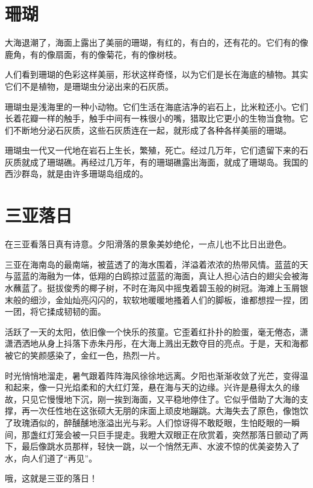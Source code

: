 \documentclass[12pt,UTF-8,openany]{ctexbook}
\begin{document}
\chapter{珊瑚}

\begin{large}
    
    大海退潮了，海面上露出了美丽的珊瑚，有红的，有白的，还有花的。它们有的像鹿角，有的像扇面，有的像菊花，有的像树枝。
    
    人们看到珊瑚的色彩这样美丽，形状这样奇怪，以为它们是长在海底的植物。其实它们不是植物，是珊瑚虫分泌出来的石灰质。
    
    珊瑚虫是浅海里的一种小动物。它们生活在海底洁净的岩石上，比米粒还小。它们长着花瓣一样的触手，触手中间有一株很小的嘴，猎取比它更小的生物当食物。它们不断地分泌石灰质，这些石灰质连在一起，就形成了各种各样美丽的珊瑚。
    
    珊瑚虫一代又一代地在岩石上生长，繁殖，死亡。经过几万年，它们遗留下来的石灰质就成了珊瑚礁。再经过几万年，有的珊瑚礁露出海面，就成了珊瑚岛。我国的西沙群岛，就是由许多珊瑚岛组成的。
    
\end{large}



\chapter{三亚落日}

\begin{large}
    
    在三亚看落日真有诗意。夕阳滑落的景象美妙绝伦，一点儿也不比日出逊色。
    
    三亚在海南岛的最南端，被蓝透了的海水围着，洋溢着浓浓的热带风情。蓝蓝的天与蓝蓝的海融为一体，低翔的白鸥掠过蓝蓝的海面，真让人担心洁白的翅尖会被海水蘸蓝了。挺拔俊秀的椰子树，不时在海风中摇曳着碧玉般的树冠。海滩上玉屑银末般的细沙，金灿灿亮闪闪的，软软地暖暖地搔着人们的脚板，谁都想捏一捏，团一团，将它揉成韧韧的面。
    
    活跃了一天的太阳，依旧像一个快乐的孩童。它歪着红扑扑的脸蛋，毫无倦态，潇潇洒洒地从身上抖落下赤朱丹彤，在大海上溅出无数夺目的亮点。于是，天和海都被它的笑颜感染了，金红一色，热烈一片。
    
    时光悄悄地溜走，暑气跟着阵阵海风徐徐地远离。夕阳也渐渐收敛了光芒，变得温和起来，像一只光焰柔和的大红灯笼，悬在海与天的边缘。兴许是悬得太久的缘故，只见它慢慢地下沉，刚一挨到海面，又平稳地停住了。它似乎借助了大海的支撑，再一次任性地在这张硕大无朋的床面上顽皮地蹦跳。大海失去了原色，像饱饮了玫瑰酒似的，醉醺醺地涨溢出光与彩。人们惊讶得不敢眨眼，生怕眨眼的一瞬间，那盏红灯笼会被一只巨手提走。我瞪大双眼正在欣赏着，突然那落日颤动了两下，最后像跳水员那样，轻快一跳，以一个悄然无声、水波不惊的优美姿势入了水，向人们道了“再见”。
    
    哦，这就是三亚的落日！
    
\end{large}
\end{document}
